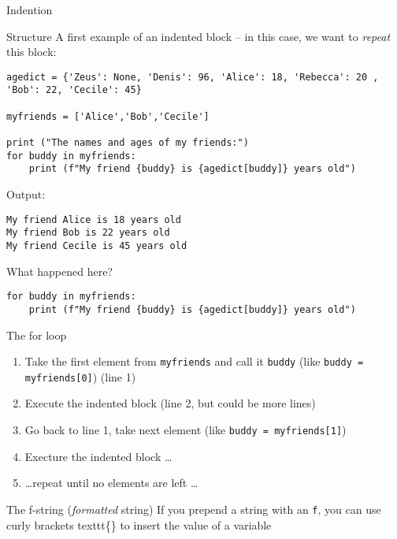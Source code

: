 \documentclass{beamer}
\begin{document}
\begin{frame}[fragile]{Indention}
\begin{block}{Structure}
	A first example of an indented block -- in this case, we want to \emph{repeat} this block:
\end{block}
\begin{lstlisting}
agedict = {'Zeus': None, 'Denis': 96, 'Alice': 18, 'Rebecca': 20 , 'Bob': 22, 'Cecile': 45}

myfriends = ['Alice','Bob','Cecile']

print ("The names and ages of my friends:")
for buddy in myfriends:
	print (f"My friend {buddy} is {agedict[buddy]} years old")
\end{lstlisting}

Output:
\begin{lstlisting}
My friend Alice is 18 years old
My friend Bob is 22 years old
My friend Cecile is 45 years old
\end{lstlisting}
\end{frame}

\begin{frame}[fragile]{What happened here?}

\begin{lstlisting}
for buddy in myfriends:
    print (f"My friend {buddy} is {agedict[buddy]} years old")
\end{lstlisting}

\small
	\begin{block}{The for loop}
\begin{enumerate}
	\item Take the first element from \texttt{myfriends} and call it \texttt{buddy} (like \texttt{buddy = myfriends[0]}) (line 1)
	\item Execute the indented block (line 2, but could be more lines)
	\item Go back to line 1, take next element  (like \texttt{buddy = myfriends[1]}) 
	\item Execture the indented block \ldots
	\item \ldots repeat until no elements are left \ldots
\end{enumerate}
	\end{block}
	
	\begin{block}{The f-string (\emph{formatted} string)}
If you prepend a string with an \texttt{f}, you can use curly brackets texttt{\{\}} to insert the value of a variable
	\end{block}
	
\end{frame}
\end{document}
